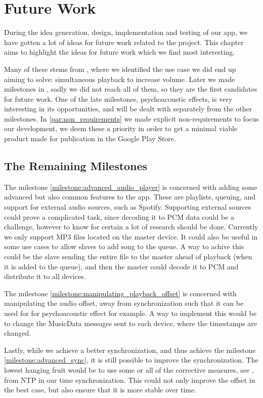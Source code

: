 \chapter{Future Work}\label{cha:future_work}
During the idea generation, design, implementation and testing of our app, we have gotten a lot of ideas for future work related to the project.
This chapter aims to highlight the ideas for future work which we find most interesting.

Many of these stems from , where we identified the use case we did end up aiming to solve: simultaneous playback to increase volume.
Later we made milestones in , sadly we did not reach all of them, so they are the first candidates for future work.
One of the late milestones, psychoacoustic effects, is very interesting in its opportunities, and will be dealt with separately from the other milestones.
In \cref{par:non_requirements} we made explicit non-requirements to focus our development, we deem these a priority in order to get a minimal viable product made for publication in the Google Play Store.

\section{The Remaining Milestones}
The milestone \ref{milestone:advanced_audio_player} is concerned with adding some advanced but also common features to the app.
These are playlists, queuing, and support for external audio sources, such as Spotify.
Supporting external sources could prove a complicated task, since decoding it to PCM data could be a challenge, however to know for certain a lot of research should be done.
Currently we only support MP3 files located on the master device.
It could also be useful in some use cases to allow slaves to add song to the queue.
A way to achive this could be the slave sending the entire file to the master ahead of playback (when it is added to the queue), and then the master could decode it to PCM and distribute it to all devices.

The milestone \ref{milestone:manipulating_playback_offset} is concerned with manipulating the audio offset, away from synchronization such that it can be used for for psychoacoustic effect for example.
A way to implement this would be to change the MusicData messages sent to each device, where the timestamps are changed.

Lastly, while we achieve a better synchronization, and thus achieve the milestone \ref{milestone:advanced_sync}, it is still possible to improve the synchronization.
The lowest hanging fruit would be to use some or all of the corrective measures, see , from \ac{NTP} in our time synchronization.
This could not only improve the offset in the best case, but also ensure that it is more stable over time.

